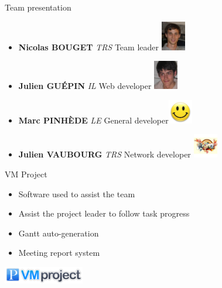 \documentclass[12pt]{beamer}
\begin{document}
\begin{frame}{Team presentation}
    \begin{itemize}
	\item {\bf Nicolas BOUGET} \emph{TRS} Team leader \hfill \includegraphics[width=30pt]{img/bouget.jpg}\\
	\vfill
	\item {\bf Julien GUÉPIN} \emph{IL} Web developer \hfill \includegraphics[width=30pt]{img/guepin.jpg}
	\vfill
	\item {\bf Marc PINHÈDE} \emph{LE} General developer\hfill \includegraphics[width=30pt]{img/pinhede.jpg}
	\vfill
	\item {\bf Julien VAUBOURG} \emph{TRS} Network developer \hfill \includegraphics[width=30pt]{img/vaubourg.jpg}
    \end{itemize}
\end{frame}


\begin{frame}{VM Project}
    \begin{itemize}[<+->]
	\item Software used to assist the team
    	\vfill
    	\item Assist the project leader to follow task progress
    	\vfill
    	\item Gantt auto-generation
    	\vfill
    	\item Meeting report system
    \end{itemize}
    \vfill \hfill \includegraphics[width=100pt]{img/vmproject_logo.png}
\end{frame}
\end{document}
